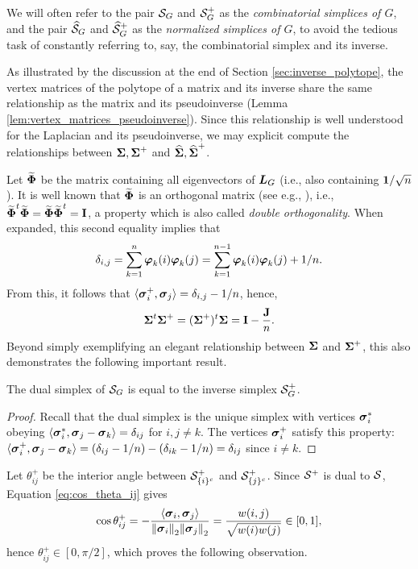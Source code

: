 We will often refer to the pair $\mathcal{S}_G$ and $\mathcal{S}_G^+$ as the \emph{combinatorial simplices of $G$}, and the pair $\widehat{\mathcal{S}}_G$ and $\widehat{\mathcal{S}}_G^+$ as the \emph{normalized simplices of $G$}, to avoid the tedious task of constantly referring to, say, the combinatorial simplex and its inverse. 

As illustrated by the discussion at the end of Section \ref{sec:inverse_polytope}, the vertex matrices of the polytope of a matrix and its inverse share the same relationship as the matrix and its pseudoinverse (Lemma \ref{lem:vertex_matrices_pseudoinverse}). Since this relationship is well understood for the Laplacian and its pseudoinverse, we may explicit compute the relationships between $\boldsymbol{\Sigma},\boldsymbol{\Sigma}^+$ and $\widehat{\boldsymbol{\Sigma}},\widehat{\boldsymbol{\Sigma}}^+$. 

Let $\widetilde{\boldsymbol{\Phi}}$ be the matrix containing all eigenvectors of $\vb*{L}_G$ (i.e., also containing $\vb{1}/\sqrt{n}$).  It is well known that $\widetilde{\boldsymbol{\Phi}}$ is an orthogonal matrix (see e.g., \cite{van2013double}), i.e., $\widetilde{\boldsymbol{\Phi}}^t \widetilde{\boldsymbol{\Phi}}=\widetilde{\boldsymbol{\Phi}}\widetilde{\boldsymbol{\Phi}}^t=\vb{I}$, a property which is also called \emph{double orthogonality}. When expanded, this second equality implies that
\begin{equation}
\label{eq:sum_double_ortho}
\delta_{i,j}=\sum_{k=1}^n \vb*{\varphi}_k(i)\vb*{\varphi}_k(j) = \sum_{k=1}^{n-1} \vb*{\varphi}_k(i)\vb*{\varphi}_k(j) + 1/n.
\end{equation}
From this, it follows that $\langle\vb*{\sigma}_i^+,\vb*{\sigma}_j\rangle = \delta_{i,j} - 1/n$, 
hence, 
\begin{equation}
\label{eq:sv+sv}
    \boldsymbol{\Sigma}^t\boldsymbol{\Sigma}^+=(\boldsymbol{\Sigma}^+)^t\boldsymbol{\Sigma}=\vb{I}-\frac{\vb{J}}{n}.
\end{equation}
Beyond simply exemplifying an elegant relationship between $\boldsymbol{\Sigma}$ and $\boldsymbol{\Sigma}^+$, this also demonstrates the following important result. 

\begin{observation}
	\label{obs:inverse_is_dual}
	The dual simplex of $\mathcal{S}_G$ is equal to the inverse simplex $\mathcal{S}_G^+$. 
\end{observation}
\begin{proof}
	Recall that the dual simplex is the unique simplex with vertices $\vb*{\sigma}_i^*$ obeying $\langle \vb*{\sigma}_i^*,\vb*{\sigma}_j-\vb*{\sigma}_k\rangle = \delta_{ij}$ for $i,j\neq k$. The vertices $\vb*{\sigma}_i^+$ satisfy this property: $\langle \vb*{\sigma}_i^+,\vb*{\sigma}_j-\vb*{\sigma}_k\rangle = (\delta_{ij}-1/n) - (\delta_{ik} - 1/n) = \delta_{ij}$ since $i\neq k$. 
\end{proof}
Let $\theta^+_{ij}$ be the interior angle between $\mathcal{S}^+_{\{i\}^c}$ and $\mathcal{S}^+_{\{j\}^c}$. Since $\mathcal{S}^+$ is dual to $\mathcal{S}$, Equation \eqref{eq:cos_theta_ij} gives 
\[\cos\theta_{ij}^+ = - \frac{\langle \vb*{\sigma}_i,\vb*{\sigma}_j\rangle}{\norm{\vb*{\sigma}_i}_2\norm{\vb*{\sigma}_j}_2} = \frac{w(i,j)}{\sqrt{w(i)w(j)}}\in[0,1],\]
hence $\theta^+_{ij}\in[0,\pi/2]$, which proves the following observation. 

